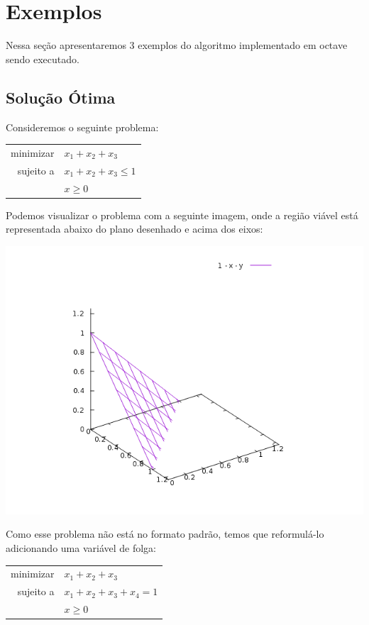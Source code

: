 \documentclass[12pt]{article}
\begin{document}
\newpage
\section{Exemplos}
	Nessa seção apresentaremos 3 exemplos do algoritmo implementado em octave sendo executado. 
	
	\subsection{Solução Ótima}
		Consideremos o seguinte problema:
	\begin{center}	
    	\begin{tabular}{r l}
	  		minimizar & $x_1 + x_2 + x_3$ \\
        
        	sujeito a & $x_1 + x_2 + x_3 \leq 1$ \\
            & $x \geq 0$ \\
        \end{tabular}
    \end{center}
    
	Podemos visualizar o problema com a seguinte imagem, onde a região viável está representada abaixo do plano desenhado e acima dos eixos:
	\begin{center}
	\includegraphics[scale=0.8]{xyz}	
	\end{center}

	Como esse problema não está no formato padrão, temos que reformulá-lo adicionando uma variável de folga:
	\begin{center}	
    	\begin{tabular}{r l}
	  		minimizar & $x_1 + x_2 + x_3$ \\
        
        	sujeito a & $x_1 + x_2 + x_3 + x_4 = 1$ \\
            & $x \geq 0$ \\
        \end{tabular}
    \end{center}
    
\end{document}
